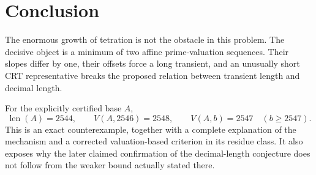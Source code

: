 \documentclass[11pt,a4paper]{article}
\theoremstyle{definition}
\theoremstyle{remark}
\newcommand{\len}{\operatorname{len}}
\begin{document}
\section{Conclusion}
The enormous growth of tetration is not the obstacle in this problem. The decisive object is a minimum of two affine prime-valuation sequences. Their slopes differ by one, their offsets force a long transient, and an unusually short CRT representative breaks the proposed relation between transient length and decimal length.

For the explicitly certified base $A$,
\[
 \len(A)=2544,\qquad
 V(A,2546)=2548,\qquad
 V(A,b)=2547\quad(b\ge2547).
\]
This is an exact counterexample, together with a complete explanation of the mechanism and a corrected valuation-based criterion in its residue class. It also exposes why the later claimed confirmation of the decimal-length conjecture does not follow from the weaker bound actually stated there.

\appendix
\clearpage
\end{document}

